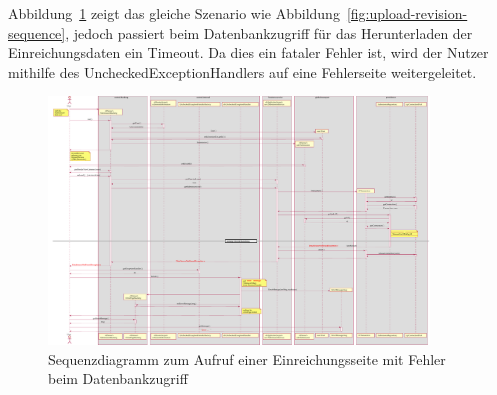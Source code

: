 Abbildung~\ref{fig:upload-revision-sequence-failure} zeigt das gleiche Szenario wie Abbildung~\ref{fig:upload-revision-sequence},
jedoch passiert beim Datenbankzugriff für das Herunterladen der Einreichungsdaten ein Timeout.
Da dies ein fataler Fehler ist, wird der Nutzer mithilfe des UncheckedExceptionHandlers auf eine Fehlerseite weitergeleitet.

\begin{figure}[H]
    \centering
    \includegraphics[width=0.9\textwidth]{graphics/upload_revision_failure}
    \caption{Sequenzdiagramm zum Aufruf einer Einreichungsseite mit Fehler beim Datenbankzugriff}
    \label{fig:upload-revision-sequence-failure}
\end{figure}
